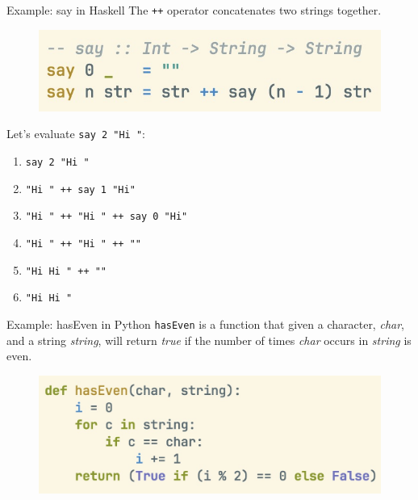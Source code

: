 \documentclass[pdf]{beamer}
\begin{document}
\begin{frame}[fragile]{Example: say in Haskell}
  The \verb|++| operator concatenates two strings together.

  \begin{figure}[H]
    \centering
    \includegraphics[width=\linewidth]{say-hs}
  \end{figure}

  \pause
  Let's evaluate \verb|say 2 "Hi "|:

  \begin{enumerate}
    \item<1-> \verb|say 2 "Hi "|
    \item<2-> \verb|"Hi " ++ say 1 "Hi"|
    \item<3-> \verb|"Hi " ++ "Hi " ++ say 0 "Hi"|
    \item<4-> \verb|"Hi " ++ "Hi " ++ ""|
    \item<5-> \verb|"Hi Hi " ++ ""|
    \item<6-> \verb|"Hi Hi "|
  \end{enumerate}

\end{frame}

\begin{frame}[fragile]{Example: hasEven in Python}
  \verb|hasEven| is a function that given a character, \textit{char}, and a string \textit{string}, will return \textit{true} if the number of times \textit{char} occurs in \textit{string} is even.

  \begin{figure}[H]
    \centering
    \includegraphics[width=\linewidth]{hasEven-py}
  \end{figure}

\end{frame}
\end{document}
